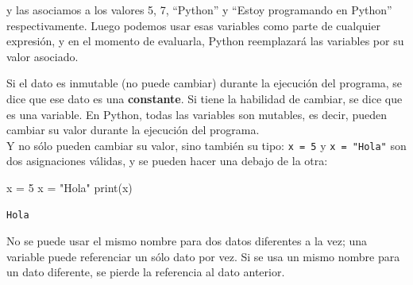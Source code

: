 \documentclass[
  letterpaper,
  DIV=11,
  numbers=noendperiod]{scrreprt}
\newenvironment{Shaded}{\begin{snugshade}}{\end{snugshade}}
\newcommand{\BuiltInTok}[1]{\textcolor[rgb]{0.00,0.23,0.31}{#1}}
\newcommand{\DecValTok}[1]{\textcolor[rgb]{0.68,0.00,0.00}{#1}}
\newcommand{\NormalTok}[1]{\textcolor[rgb]{0.00,0.23,0.31}{#1}}
\newcommand{\OperatorTok}[1]{\textcolor[rgb]{0.37,0.37,0.37}{#1}}
\newcommand{\StringTok}[1]{\textcolor[rgb]{0.13,0.47,0.30}{#1}}
\begin{document}
y las asociamos a los valores 5, 7, ``Python'' y ``Estoy programando en
Python'' respectivamente. Luego podemos usar esas variables como parte
de cualquier expresión, y en el momento de evaluarla, Python reemplazará
las variables por su valor asociado.

\begin{tcolorbox}[enhanced jigsaw, opacitybacktitle=0.6, toptitle=1mm, toprule=.15mm, arc=.35mm, breakable, bottomrule=.15mm, opacityback=0, leftrule=.75mm, rightrule=.15mm, title=\textcolor{quarto-callout-note-color}{\faInfo}\hspace{0.5em}{Variables y Constantes}, left=2mm, bottomtitle=1mm, colframe=quarto-callout-note-color-frame, colback=white, titlerule=0mm, coltitle=black, colbacktitle=quarto-callout-note-color!10!white]

Si el dato es inmutable (no puede cambiar) durante la ejecución del
programa, se dice que ese dato es una \textbf{constante}. Si tiene la
habilidad de cambiar, se dice que es una variable. En Python, todas las
variables son mutables, es decir, pueden cambiar su valor durante la
ejecución del programa.\\
Y no sólo pueden cambiar su valor, sino también su tipo:
\texttt{x\ =\ 5} y \texttt{x\ =\ "Hola"} son dos asignaciones válidas, y
se pueden hacer una debajo de la otra:

\begin{Shaded}
\begin{Highlighting}[]
\NormalTok{x }\OperatorTok{=} \DecValTok{5}
\NormalTok{x }\OperatorTok{=} \StringTok{"Hola"}
\BuiltInTok{print}\NormalTok{(x)}
\end{Highlighting}
\end{Shaded}

\begin{verbatim}
Hola
\end{verbatim}

\end{tcolorbox}

\begin{tcolorbox}[enhanced jigsaw, opacitybacktitle=0.6, toptitle=1mm, toprule=.15mm, arc=.35mm, breakable, bottomrule=.15mm, opacityback=0, leftrule=.75mm, rightrule=.15mm, title=\textcolor{quarto-callout-warning-color}{\faExclamationTriangle}\hspace{0.5em}{Nombres de Variables}, left=2mm, bottomtitle=1mm, colframe=quarto-callout-warning-color-frame, colback=white, titlerule=0mm, coltitle=black, colbacktitle=quarto-callout-warning-color!10!white]

No se puede usar el mismo nombre para dos datos diferentes a la vez; una
variable puede referenciar un sólo dato por vez. Si se usa un mismo
nombre para un dato diferente, se pierde la referencia al dato
anterior.\\

\end{tcolorbox}
\end{document}
